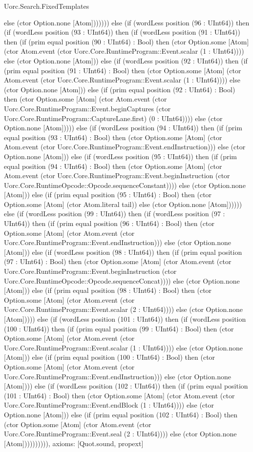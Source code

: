 \begin{lexlean}{Uorc.Search.FixedTemplates}
\begin{semanticmodule}
{else (ctor Option.none [Atom])))))) else (if (wordLess position (96 : UInt64)) then (if (wordLess position (93 : UInt64)) then (if (wordLess position (91 : UInt64)) then (if (prim equal position (90 : UInt64) : Bool) then (ctor Option.some [Atom] (ctor Atom.event (ctor Uorc.Core.RuntimeProgram::Event.scalar (1 : UInt64)))) else (ctor Option.none [Atom])) else (if (wordLess position (92 : UInt64)) then (if (prim equal position (91 : UInt64) : Bool) then (ctor Option.some [Atom] (ctor Atom.event (ctor Uorc.Core.RuntimeProgram::Event.scalar (1 : UInt64)))) else (ctor Option.none [Atom])) else (if (prim equal position (92 : UInt64) : Bool) then (ctor Option.some [Atom] (ctor Atom.event (ctor Uorc.Core.RuntimeProgram::Event.beginCaptures (ctor Uorc.Core.RuntimeProgram::CaptureLane.first) (0 : UInt64)))) else (ctor Option.none [Atom])))) else (if (wordLess position (94 : UInt64)) then (if (prim equal position (93 : UInt64) : Bool) then (ctor Option.some [Atom] (ctor Atom.event (ctor Uorc.Core.RuntimeProgram::Event.endInstruction))) else (ctor Option.none [Atom])) else (if (wordLess position (95 : UInt64)) then (if (prim equal position (94 : UInt64) : Bool) then (ctor Option.some [Atom] (ctor Atom.event (ctor Uorc.Core.RuntimeProgram::Event.beginInstruction (ctor Uorc.Core.RuntimeOpcode::Opcode.sequenceConstant)))) else (ctor Option.none [Atom])) else (if (prim equal position (95 : UInt64) : Bool) then (ctor Option.some [Atom] (ctor Atom.literal tail)) else (ctor Option.none [Atom]))))) else (if (wordLess position (99 : UInt64)) then (if (wordLess position (97 : UInt64)) then (if (prim equal position (96 : UInt64) : Bool) then (ctor Option.some [Atom] (ctor Atom.event (ctor Uorc.Core.RuntimeProgram::Event.endInstruction))) else (ctor Option.none [Atom])) else (if (wordLess position (98 : UInt64)) then (if (prim equal position (97 : UInt64) : Bool) then (ctor Option.some [Atom] (ctor Atom.event (ctor Uorc.Core.RuntimeProgram::Event.beginInstruction (ctor Uorc.Core.RuntimeOpcode::Opcode.sequenceConcat)))) else (ctor Option.none [Atom])) else (if (prim equal position (98 : UInt64) : Bool) then (ctor Option.some [Atom] (ctor Atom.event (ctor Uorc.Core.RuntimeProgram::Event.scalar (2 : UInt64)))) else (ctor Option.none [Atom])))) else (if (wordLess position (101 : UInt64)) then (if (wordLess position (100 : UInt64)) then (if (prim equal position (99 : UInt64) : Bool) then (ctor Option.some [Atom] (ctor Atom.event (ctor Uorc.Core.RuntimeProgram::Event.scalar (1 : UInt64)))) else (ctor Option.none [Atom])) else (if (prim equal position (100 : UInt64) : Bool) then (ctor Option.some [Atom] (ctor Atom.event (ctor Uorc.Core.RuntimeProgram::Event.endInstruction))) else (ctor Option.none [Atom]))) else (if (wordLess position (102 : UInt64)) then (if (prim equal position (101 : UInt64) : Bool) then (ctor Option.some [Atom] (ctor Atom.event (ctor Uorc.Core.RuntimeProgram::Event.endBlock (1 : UInt64)))) else (ctor Option.none [Atom])) else (if (prim equal position (102 : UInt64) : Bool) then (ctor Option.some [Atom] (ctor Atom.event (ctor Uorc.Core.RuntimeProgram::Event.seal (2 : UInt64)))) else (ctor Option.none [Atom]))))))))),
  axioms: [Quot.sound, propext]
}


\end{semanticmodule}
\end{lexlean}
